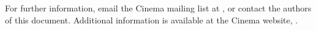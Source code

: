For further information, email the Cinema mailing list at \cinemaemail, or contact the authors of this document. Additional information is available at the Cinema website, \cinemawebsite.
